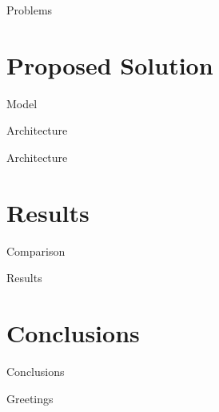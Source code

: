 \documentclass[english]{beamer}
\begin{document}
\begin{frame}{Problems}

\end{frame}
\section{Proposed Solution}
\begin{frame}{Model}
  
\end{frame}
\begin{frame}{Architecture}
  
\end{frame}
\begin{frame}{Architecture}
  
\end{frame}

\section{Results}
\begin{frame}{Comparison}

\end{frame}

\begin{frame}{Results}

\end{frame}

\section{Conclusions}
\begin{frame}{Conclusions}

\end{frame}

\begin{frame}{Greetings}

\end{frame}
\end{document}
